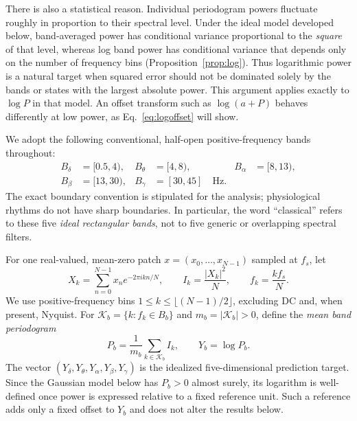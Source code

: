 \documentclass[11pt,a4paper]{article}
\begin{document}
There is also a statistical reason. Individual periodogram powers fluctuate
roughly in proportion to their spectral level. Under the ideal model developed
below, band-averaged power has conditional variance proportional to the
\emph{square} of that level, whereas log band power has conditional variance
that depends only on the number of frequency bins (Proposition~\ref{prop:log}).
Thus logarithmic power is a natural target when squared error should not be
dominated solely by the bands or states with the largest absolute power.
This argument applies exactly to $\log P$ in that model. An offset transform
such as $\log(a+P)$ behaves differently at low power, as
Eq.~\eqref{eq:logoffset} will show.

We adopt the following conventional, half-open positive-frequency bands throughout:
\begin{equation}
\begin{aligned}
B_{\delta}&=[0.5,4), & B_{\theta}&=[4,8), & B_{\alpha}&=[8,13),\\
B_{\beta}&=[13,30), & B_{\gamma}&=[30,45]\quad\text{Hz}.
\end{aligned}
\label{eq:bands}
\end{equation}
The exact boundary convention is stipulated for the analysis; physiological rhythms do
not have sharp boundaries. In particular, the word ``classical'' refers to these five
\emph{ideal rectangular bands}, not to five generic or overlapping spectral filters.

For one real-valued, mean-zero patch $x=(x_0,\ldots,x_{N-1})$ sampled at $f_s$, let
\begin{equation}
X_k=\sum_{n=0}^{N-1}x_n e^{-2\pi i kn/N},\qquad
I_k=\frac{|X_k|^2}{N},\qquad f_k=\frac{kf_s}{N}.
\label{eq:dft}
\end{equation}
We use positive-frequency bins $1\leq k\leq\lfloor(N-1)/2\rfloor$, excluding DC and,
when present, Nyquist. For $\mathcal K_b=\{k:f_k\in B_b\}$ and
$m_b=|\mathcal K_b|>0$, define the \emph{mean band periodogram}
\begin{equation}
P_b=\frac{1}{m_b}\sum_{k\in\mathcal K_b}I_k,
\qquad Y_b=\log P_b.
\label{eq:bandpower}
\end{equation}
The vector $(Y_{\delta},Y_{\theta},Y_{\alpha},Y_{\beta},Y_{\gamma})$ is the
idealized five-dimensional prediction target. Since the Gaussian model below has
$P_b>0$ almost surely, its logarithm is well-defined once power is expressed
relative to a fixed reference unit. Such a reference adds only a fixed offset
to $Y_b$ and does not alter the results below.
\end{document}
